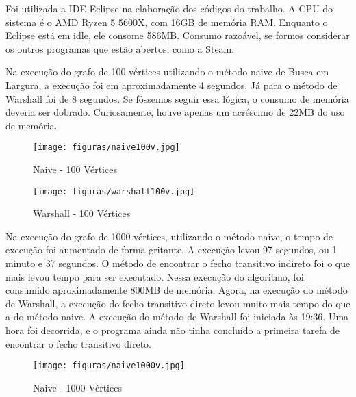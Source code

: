 \vspace{\baselineskip}

Foi utilizada a IDE Eclipse na elaboração dos códigos do trabalho. A CPU do sistema é o AMD Ryzen 5 5600X, com 16GB de memória RAM. Enquanto o Eclipse está em idle, ele consome 586MB. Consumo razoável, se formos considerar os outros programas que estão abertos, como a Steam.

\vspace{\baselineskip}

Na execução do grafo de 100 vértices utilizando o método naive de Busca em Largura, a execução foi em aproximadamente 4 segundos. Já para o método de Warshall foi de 8 segundos. Se fôssemos seguir essa lógica, o consumo de memória deveria ser dobrado. Curiosamente, houve apenas um acréscimo de 22MB do uso de memória.


\begin{figure}[H]
  \centering
  \begin{minipage}[t]{0.48\textwidth}
    \centering
    \texttt{[image: figuras/naive100v.jpg]}
	\caption[\hspace{0.1cm}Eclipse Naive100v]{Naive - 100 Vértices}
  \end{minipage}
  \hfill
  \begin{minipage}[t]{0.48\textwidth}
    \centering
    \texttt{[image: figuras/warshall100v.jpg]}
	\caption[\hspace{0.1cm}Eclipse Warshall100v]{Warshall - 100 Vértices}
  \end{minipage}
\end{figure}
\vspace{\baselineskip}
\vspace{\baselineskip}

Na execução do grafo de 1000 vértices, utilizando o método naive, o tempo de execução foi aumentado de forma gritante. A execução levou 97 segundos, ou 1 minuto e 37 segundos. O método de encontrar o fecho transitivo indireto foi o que mais levou tempo para ser executado. Nessa execução do algoritmo, foi consumido aproximadamente 800MB de memória. Agora, na execução do método de Warshall, a execução do fecho transitivo direto levou muito mais tempo do que a do método naive. A execução do método de Warshall foi iniciada às 19:36. Uma hora foi decorrida, e o programa ainda não tinha concluído a primeira tarefa de encontrar o fecho transitivo direto.

\begin{figure}[ht]
	\centering	
	\caption[\hspace{0.1cm}Eclipse Idle]{Naive - 1000 Vértices}
	\vspace{-0.4cm}
	\texttt{[image: figuras/naive1000v.jpg]}
	 \vspace{-0.2cm}
\end{figure}
\vspace{-0.5cm}

